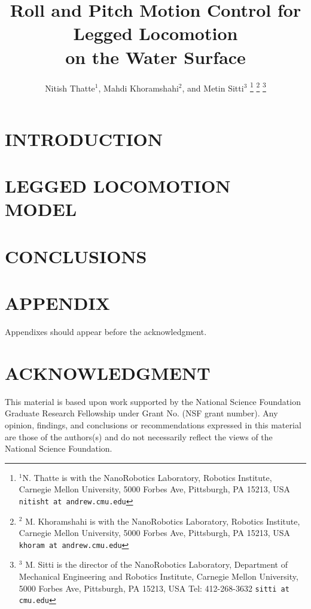 \documentclass[letterpaper, 10 pt, conference]{ieeeconf}  %
\title{\LARGE \bf
Roll and Pitch Motion Control for Legged Locomotion \\ on the Water Surface
}
\author{Nitish Thatte$^{1}$, Mahdi Khoramshahi$^{2}$, and Metin Sitti$^{3}$%
\thanks{$^{1}$N. Thatte is with the NanoRobotics Laboratory, Robotics Institute, Carnegie Mellon University, 5000 Forbes Ave, Pittsburgh, PA 15213, USA 
	{\tt\small nitisht at andrew.cmu.edu}}%
\thanks{$^{2}$ M. Khoramshahi is with the NanoRobotics Laboratory, Robotics Institute, Carnegie Mellon University, 5000 Forbes Ave, Pittsburgh, PA 15213, USA 
	{\tt\small khoram at andrew.cmu.edu}}
\thanks{$^{3}$ M. Sitti is the director of the NanoRobotics Laboratory, Department of Mechanical Engineering and Robotics Institute, Carnegie Mellon University, 5000 Forbes Ave, Pittsburgh, PA 15213, USA Tel: 412-268-3632
	{\tt\small sitti at cmu.edu}}
}
\begin{document}
\maketitle
\thispagestyle{empty}
\pagestyle{empty}

\begin{abstract}
	
\end{abstract}

\section{INTRODUCTION}

\section{LEGGED LOCOMOTION MODEL}


\section{CONCLUSIONS}



\section*{APPENDIX}

Appendixes should appear before the acknowledgment.

\section*{ACKNOWLEDGMENT}

This material is based upon work supported by the National Science Foundation Graduate Research Fellowship under Grant No. (NSF grant number). Any opinion, findings, and conclusions or recommendations expressed in this material are those of the authors(s) and do not necessarily reflect the views of the National Science Foundation.



\end{document}
